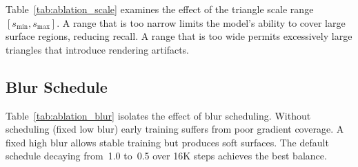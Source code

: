 Table~\ref{tab:ablation_scale} examines the effect of the triangle scale range $[s_{\min}, s_{\max}]$. A range that is too narrow limits the model's ability to cover large surface regions, reducing recall. A range that is too wide permits excessively large triangles that introduce rendering artifacts.

\begin{table}[h]
\centering
\caption{\textbf{Ablation on triangle scale range} (RE10K, 6 views).}
\label{tab:ablation_scale}
\end{table}

\subsection{Blur Schedule}
\label{sec:app_ablation_blur}

Table~\ref{tab:ablation_blur} isolates the effect of blur scheduling. Without scheduling (fixed low blur) early training suffers from poor gradient coverage. A fixed high blur allows stable training but produces soft surfaces. The default schedule decaying from~1.0 to~0.5 over 16K steps achieves the best balance.

\begin{table}[h]
\centering
\caption{\textbf{Ablation on blur scheduling} (RE10K, 6 views).}
\label{tab:ablation_blur}
\end{table}




